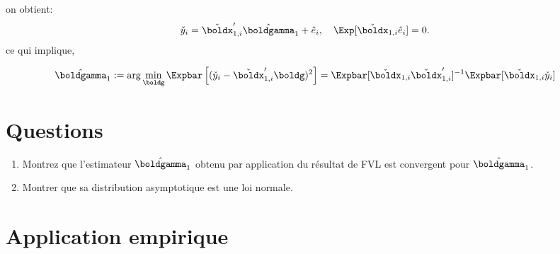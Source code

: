 	on obtient:
	\begin{align}
		\check{y}_i &= \check{\boldx}_{1, i}^\prime\hat{\boldgamma}_1 + \hat{e}_i, \quad \Exp[ \check{\boldx}_{1, i} \hat{e}_i]=0.
		\label{eq3}
	\end{align}
ce qui implique,

\begin{align*}
	\hat{\boldgamma}_1 &:= \arg\min_{\boldg}\Expbar\left[(\check{y}_i - \check{\boldx}_{1, i}^\prime \boldg)^2\right] = 
	\Expbar[\check{\boldx}_{1, i}\check{\boldx}_{1, i}^\prime]^{-1}\Expbar[\check{\boldx}_{1, i}\check{y}_i]
\end{align*}

\newpage

\section{Questions}

\begin{enumerate}
	\item Montrez que l'estimateur $\hat{\boldgamma}_1$ obtenu par application du résultat de FVL est convergent pour
	$\hat{\boldgamma}_1$. 
	\item Montrer que sa distribution asymptotique est une loi normale. 
\end{enumerate}

\section{Application empirique}



 
